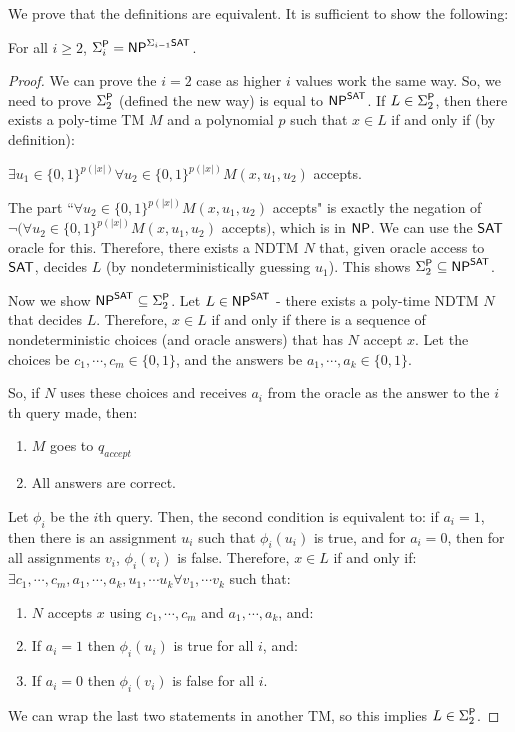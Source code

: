 We prove that the definitions are equivalent. It is sufficient to show the following:

\begin{theorem}
For all $i \ge 2$, $\Sigma_i^\P = \NP^{\Sigma_{i-1}\SAT}$.
\end{theorem}

\begin{proof}
We can prove the $i=2$ case as higher $i$ values work the same way. So, we need to prove $\Sigma_2^\P$ (defined the new way) is equal to $\NP^{\SAT}$. If $L \in \Sigma_2^\P$, then there exists a poly-time TM $M$ and a polynomial $p$ such that $x \in L$ if and only if (by definition):
\begin{center}
$\exists u_1 \in \{0, 1\}^{p(|x|)} \forall u_2 \in \{0, 1\}^{p(|x|)} M(x, u_1, u_2)$ accepts.
\end{center}
The part ``$\forall u_2 \in \{0, 1\}^{p(|x|)} M(x, u_1, u_2)$ accepts" is exactly the negation of $\neg (\forall u_2 \in \{0, 1\}^{p(|x|)} M(x, u_1, u_2)$ accepts$)$, which is in $\NP$. We can use the $\SAT$ oracle for this. Therefore, there exists a NDTM $N$ that, given oracle access to $\SAT$, decides $L$ (by nondeterministically guessing $u_1$). This shows $\Sigma_2^\P \subseteq \NP^{\SAT}$.

\par Now we show $\NP^{\SAT} \subseteq \Sigma_2^\P$. Let $L \in \NP^{\SAT}$ - there exists a poly-time NDTM $N$ that decides $L$. Therefore, $x \in L$ if and only if there is a sequence of nondeterministic choices (and oracle answers) that has $N$ accept $x$. Let the choices be $c_1, \cdots, c_m \in \{0, 1\}$, and the answers be $a_1, \cdots, a_k \in \{0, 1\}$.

\par So, if $N$ uses these choices and receives $a_i$ from the oracle as the answer to the $i$th query made, then:
\begin{enumerate}
\item $M$ goes to $q_{accept}$
\item All answers are correct.
\end{enumerate}
Let $\phi_i$ be the $i$th query. Then, the second condition is equivalent to: if $a_i = 1$, then there is an assignment $u_i$ such that $\phi_i(u_i)$ is true, and for $a_i = 0$, then for all assignments $v_i$, $\phi_i(v_i)$ is false. Therefore, $x \in L$ if and only if: $\exists c_1, \cdots, c_m, a_1, \cdots, a_k, u_1, \cdots u_k \forall v_1, \cdots v_k$ such that:
\begin{enumerate}
\item $N$ accepts $x$ using $c_1, \cdots, c_m$ and $a_1, \cdots, a_k$, and:
\item If $a_i = 1$ then $\phi_i(u_i)$ is true for all $i$, and:
\item If $a_i = 0$ then $\phi_i(v_i)$ is false for all $i$.
\end{enumerate}
We can wrap the last two statements in another TM, so this implies $L \in \Sigma_2^\P$.
\end{proof}


